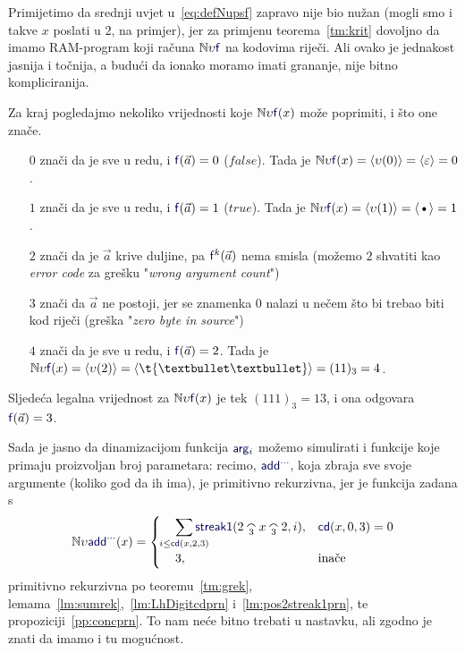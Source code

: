 Primijetimo da srednji uvjet u~\eqref{eq:defNupsf} zapravo nije bio nužan (mogli smo i takve $x$ poslati u $2$, na primjer), jer za primjenu teorema~\ref{tm:krit} dovoljno da imamo RAM-program koji računa $\N\upsilon\f f$ na kodovima riječi. Ali ovako je jednakost jasnija i točnija, a budući da ionako moramo imati grananje, nije bitno kompliciranija.

Za kraj pogledajmo nekoliko vrijednosti koje $\N\upsilon\f f(x)$ može poprimiti, i što one znače.
\begin{itemize}
    \item[$0$] znači da je sve u redu, i $\f f(\vec a)=0$ ($\mathit{false}$). Tada je $\N\upsilon\f f(x)=\kr{\upsilon(0)}=\kr{\varepsilon}=0$.
    \item[$1$] znači da je sve u redu, i $\f f(\vec a)=1$ ($\mathit{true}$). Tada je $\N\upsilon\f f(x)=\kr{\upsilon(1)}=\kr{\text\textbullet}=1$.
    \item[$2$] znači da je $\vec a$ krive duljine, pa $\f f^k(\vec a)$ nema smisla (možemo $2$ shvatiti kao \emph{error code} za grešku "\emph{wrong argument count}")
    \item[$3$] znači da $\vec a$ ne postoji, jer se znamenka $0$ nalazi u nečem što bi trebao biti kod riječi (greška "\emph{zero byte in source}")
    \item[$4$] znači da je sve u redu, i $\f f(\vec a)=2$. Tada je $\N\upsilon\f f(x)=\kr{\upsilon(2)}=\kr{\t{\textbullet\textbullet}}=(11)_3=4$.
\end{itemize}
Sljedeća legalna vrijednost za $\N\upsilon\f f(x)$ je tek $(111)_3=13$, i ona odgovara $\f f(\vec a)=3$.

Sada je jasno da dinamizacijom funkcija $\f{arg}_i$ možemo simulirati i funkcije koje primaju proizvoljan broj parametara: recimo, $\f{add}^{\cdots}$, koja zbraja sve svoje argumente (koliko god da ih ima), je primitivno rekurzivna, jer je funkcija zadana s
\begin{equation}
    \N\upsilon\f{add}^{\cdots}(x)=\begin{cases}\quad\,\displaystyle\sum_{\mathclap{i\le\f{cd}(x,2,3)}}\f{streak1}(2\conc3x\conc32,i),&\f{cd}(x,0,3)=0\\
    \quad\,3,&\text{inače}
    \end{cases}
\end{equation}
primitivno rekurzivna po  teoremu~\ref{tm:grek}, lemama~\ref{lm:sumrek},~\ref{lm:LhDigitcdprn} i~\ref{lm:pos2streak1prn}, te propoziciji~\ref{pp:concprn}.
To nam neće bitno trebati u nastavku, ali zgodno je znati da imamo i tu mogućnost.